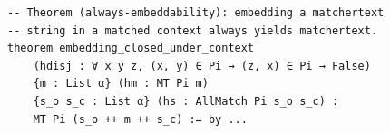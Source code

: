 \begin{lstlisting}
-- Theorem (always-embeddability): embedding a matchertext
-- string in a matched context always yields matchertext.
theorem embedding_closed_under_context
    (hdisj : ∀ x y z, (x, y) ∈ Pi → (z, x) ∈ Pi → False)
    {m : List α} (hm : MT Pi m)
    {s_o s_c : List α} (hs : AllMatch Pi s_o s_c) :
    MT Pi (s_o ++ m ++ s_c) := by ...
\end{lstlisting}